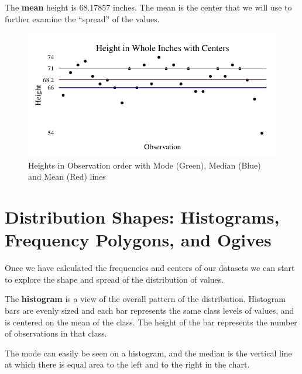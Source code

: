 \documentclass[nohyper,justified]{tufte-handout}\usepackage[]{graphicx}\usepackage[]{color}
\makeatletter
\def\maxwidth{ %
  \ifdim\Gin@nat@width>\linewidth
    \linewidth
  \else
    \Gin@nat@width
  \fi
}
\newenvironment{knitrout}{}{} %
\makeatother
\begin{document}
The \textbf{mean} height is 68.17857 inches. The mean is the center that we will use to further examine the ``spread'' of the values.

\begin{knitrout}
\color{fgcolor}\begin{figure}

{\centering \includegraphics[width=\maxwidth]{figure/graphics-center-chart-1} 

}

\caption[Heights in Observation order with Mode (Green), Median (Blue) and Mean (Red) lines]{Heights in Observation order with Mode (Green), Median (Blue) and Mean (Red) lines}\label{fig:center-chart}
\end{figure}


\end{knitrout}



\section{Distribution Shapes: Histograms, Frequency Polygons, and Ogives}

Once we have calculated the frequencies and centers of our datasets we can start to explore the shape and spread of the distribution of values. 

The \textbf{histogram} is a view of the overall pattern of the distribution. Histogram bars are evenly sized and each bar represents the same class levels of values, and is centered on the mean of the class. The height of the bar represents the number of observations in that class.

The mode can easily be seen on a histogram, and the median is the vertical line at which there is equal area to the left and to the right in the chart. 
\end{document}
